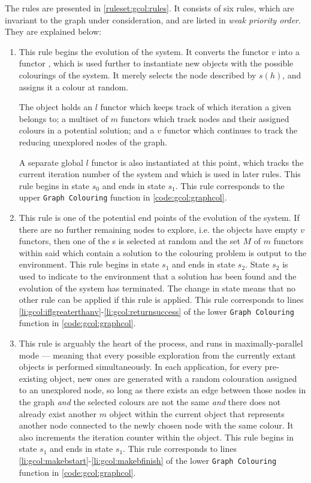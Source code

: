 The rules are presented in \cref{ruleset:gcol:rules}.  It consists of six rules, which are invariant to the graph under consideration, and are listed in \emph{weak priority order}.  They are explained below:

\begin{enumerate}
\item This rule begins the evolution of the system.  It converts the functor \(v\) into a functor \bo{}, which is used further to instantiate new objects with the possible colourings of the system.  It merely selects the node described by \(s(h)\), and assigns it a colour at random.

The \bo{} object holds an \(l\) functor which keeps track of which iteration a given \bo{} belongs to; a multiset of \(m\) functors which track nodes and their assigned colours in a potential solution; and a \(v\) functor which continues to track the reducing unexplored nodes of the graph.

A separate global \(l\) functor is also instantiated at this point, which tracks the current iteration number of the system and which is used in later rules.  This rule begins in state \(s_0\) and ends in state \(s_1\).  This rule corresponds to the upper \texttt{Graph Colouring} function in \cref{code:gcol:graphcol}.

\item This rule is one of the potential end points of the evolution of the system.  If there are no further remaining nodes to explore, i.e. the \bo{} objects have empty \(v\) functors, then one of the \bo{}s is selected at random and the set \(M\) of \(m\) functors within said \bo{} which contain a solution to the colouring problem is output to the environment.  This rule begins in state \(s_1\) and ends in state \(s_2\).  State \(s_2\) is used to indicate to the environment that a solution has been found and the evolution of the system has terminated.  The change in state means that no other rule can be applied if this rule is applied.  This rule corresponds to lines \ref{li:gcol:iflgreaterthanv}-\ref{li:gcol:returnsuccess} of the lower \texttt{Graph Colouring} function in \cref{code:gcol:graphcol}.

\item This rule is arguably the heart of the process, and runs in maximally-parallel mode --- meaning that every possible exploration from the currently extant \bo{} objects is performed simultaneously.  In each application, for every pre-existing \bo{} object, new ones are generated with a random colouration assigned to an unexplored node, so long as there exists an edge between those nodes in the graph \emph{and} the selected colours are not the same \emph{and} there does not already exist another \(m\) object within the current \bo{} object that represents another node connected to the newly chosen node with the same colour.  It also increments the iteration counter within the \bo{} object.  This rule begins in state \(s_1\) and ends in state \(s_1\).  This rule corresponds to lines \ref{li:gcol:makebstart}-\ref{li:gcol:makebfinish} of the lower \texttt{Graph Colouring} function in \cref{code:gcol:graphcol}.


\end{enumerate}
